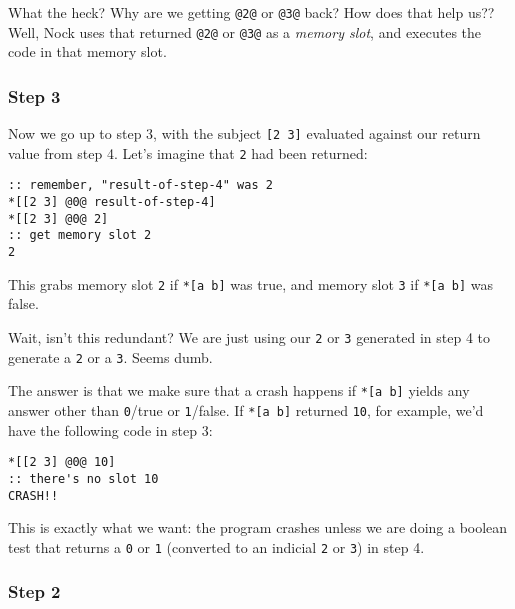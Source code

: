 \documentclass[twoside]{article}
\begin{document}
What the heck? Why are we getting \lstinline[style=inlinecode]{@2@} or \lstinline[style=inlinecode]{@3@} back? How does that help us?? Well, Nock uses that returned \lstinline[style=inlinecode]{@2@} or \lstinline[style=inlinecode]{@3@} as a \emph{memory slot}, and executes the code in that memory slot.

\subsubsection{Step 3}

Now we go up to step 3, with the subject \lstinline[style=inlinecode]{[2 3]} evaluated against our return value from step 4.  Let's imagine that \lstinline[style=inlinecode]{2} had been returned:

\begin{lstlisting}[style=listingcode]
:: remember, "result-of-step-4" was 2
*[[2 3] @0@ result-of-step-4]
*[[2 3] @0@ 2]
:: get memory slot 2
2
\end{lstlisting}

This grabs memory slot \lstinline[style=inlinecode]{2} if \lstinline[style=inlinecode]{*[a b]} was true, and memory slot \lstinline[style=inlinecode]{3} if \lstinline[style=inlinecode]{*[a b]} was false.

Wait, isn't this redundant? We are just using our \lstinline[style=inlinecode]{2} or \lstinline[style=inlinecode]{3} generated in step 4 to generate a \lstinline[style=inlinecode]{2} or a \lstinline[style=inlinecode]{3}. Seems dumb.

The answer is that we make sure that a crash happens if \lstinline[style=inlinecode]{*[a b]} yields any answer other than \lstinline[style=inlinecode]{0}/true or \lstinline[style=inlinecode]{1}/false.  If \lstinline[style=inlinecode]{*[a b]} returned \lstinline[style=inlinecode]{10}, for example, we'd have the following code in step 3:

\begin{lstlisting}[style=listingcode]
*[[2 3] @0@ 10]
:: there's no slot 10
CRASH!!
\end{lstlisting}

This is exactly what we want: the program crashes unless we are doing a boolean test that returns a \lstinline[style=inlinecode]{0} or \lstinline[style=inlinecode]{1} (converted to an indicial \lstinline[style=inlinecode]{2} or \lstinline[style=inlinecode]{3}) in step 4.

\subsubsection{Step 2}
\end{document}
